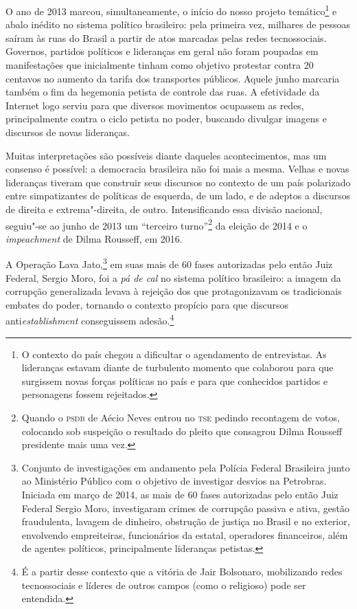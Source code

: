 O ano de 2013 marcou, simultaneamente, o início do nosso projeto
temático\footnote{O contexto do país chegou a dificultar o agendamento
  de entrevistas. As lideranças estavam diante de turbulento momento que
  colaborou para que surgissem novas forças políticas no país e para que
  conhecidos partidos e personagens fossem rejeitados.} e abalo inédito
no sistema político brasileiro: pela primeira vez, milhares de pessoas
saíram às ruas do Brasil a partir de atos marcadas pelas redes
tecnossociais. Governos, partidos políticos e lideranças em geral não
foram poupadas em manifestações que inicialmente tinham como objetivo
protestar contra 20 centavos no aumento da tarifa dos transportes
públicos. Aquele junho marcaria também o fim da hegemonia petista de
controle das ruas. A efetividade da Internet logo serviu para que
diversos movimentos ocupassem as redes, principalmente contra o ciclo
petista no poder, buscando divulgar imagens e discursos de novas
lideranças.

Muitas interpretações são possíveis diante daqueles acontecimentos, mas
um consenso é possível: a democracia brasileira não foi mais a mesma.
Velhas e novas lideranças tiveram que construir seus discursos no
contexto de um país polarizado entre simpatizantes de políticas de
esquerda, de um lado, e de adeptos a discursos de direita e
extrema"-direita, de outro. Intensificando essa divisão nacional,
seguiu"-se ao junho de 2013 um ``terceiro turno''\footnote{Quando o \textsc{psdb} de
  Aécio Neves entrou no \textsc{tse} pedindo recontagem de votos, colocando sob
  suspeição o resultado do pleito que consagrou Dilma Rousseff
  presidente mais uma vez.} da eleição de 2014 e o \textit{impeachment}
de Dilma Rousseff, em 2016.

A Operação Lava Jato,\footnote{Conjunto de investigações em andamento
  pela Polícia Federal Brasileira junto ao Ministério Público com o
  objetivo de investigar desvios na Petrobras. Iniciada em março de
  2014, as mais de 60 fases autorizadas pelo então Juiz Federal Sergio
  Moro, investigaram crimes de corrupção passiva e ativa, gestão
  fraudulenta, lavagem de dinheiro, obstrução de justiça no Brasil e no
  exterior, envolvendo empreiteiras, funcionários da estatal, operadores
  financeiros, além de agentes políticos, principalmente lideranças
  petistas.} em suas mais de 60 fases autorizadas pelo então Juiz
Federal, Sergio Moro, foi a \textit{pá de cal} no sistema político
brasileiro: a imagem da corrupção generalizada levava à rejeição dos que
protagonizavam os tradicionais embates do poder, tornando o contexto
propício para que discursos anti\textit{establishment} conseguissem
adesão.\footnote{É a partir desse contexto que a vitória de Jair
  Bolsonaro, mobilizando redes tecnossociais e líderes de outros campos
  (como o religioso) pode ser entendida.}

